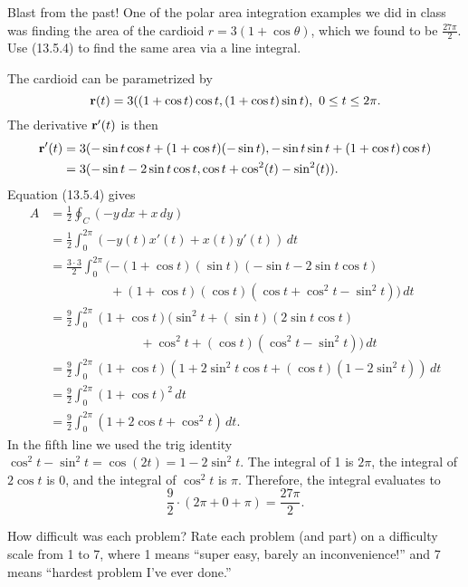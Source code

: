 \begin{problem}
  Blast from the past! One of the polar area integration examples we did in class was finding the area of the cardioid $r=3(1+\cos\theta)$, which we found to be $\frac{27\pi}2$. Use (13.5.4) to find the same area via a line integral.
\end{problem}
\begin{solution}
  The cardioid can be parametrized by
  \[\mathbf r(t) = 3((1+\cos t)\cos t,(1+\cos t)\sin t),\ 0\leq t\leq 2\pi.\]
  The derivative $\mathbf r'(t)$ is then
  \[\begin{split}
    \mathbf r'(t) &=3(-\sin t\cos t+(1+\cos t)(-\sin t),-\sin t\sin t+(1+\cos t)\cos t)\\
    &= 3(-\sin t-2\sin t\cos t,\cos t+\cos^2(t)-\sin^2(t)).
  \end{split}\]
  Equation (13.5.4) gives
  \[\begin{split}
    A &= \frac12\oint_C(-y\,dx+x\,dy)\\
    &= \frac12\int_0^{2\pi}(-y(t)x'(t)+x(t)y'(t))\,dt\\
    &= \frac{3\cdot 3}2\int_0^{2\pi}(-(1+\cos t)(\sin t)(-\sin t-2\sin t\cos t)\\
    &\hspace{2cm}+(1+\cos t)(\cos t)(\cos t+\cos^2t-\sin^2t))\,dt\\
    &= \frac92\int_0^{2\pi}(1+\cos t)(\sin^2t+(\sin t)(2\sin t\cos t)\\
    &\hspace{3cm}+\cos^2 t+(\cos t)(\cos^2 t-\sin^2 t))\,dt\\
    &= \frac92\int_0^{2\pi}(1+\cos t)(1+2\sin^2 t\cos t+(\cos t)(1-2\sin^2 t))\,dt\\
    &= \frac92\int_0^{2\pi}(1+\cos t)^2\,dt\\
    &= \frac92\int_0^{2\pi}(1+2\cos t+\cos^2 t)\,dt.
  \end{split}\]
  In the fifth line we used the trig identity $\cos^2t-\sin^2t=\cos(2t)=1-2\sin^2t$.
  The integral of 1 is $2\pi$, the integral of $2\cos t$ is 0, and the integral of $\cos^2 t$ is $\pi$. Therefore, the integral evaluates to
  \[\frac92\cdot (2\pi+0+\pi)=\frac{27\pi}2.\]
\end{solution}

\begin{problem}
  How difficult was each problem? Rate each problem (and part) on a difficulty scale from 1 to 7, where 1 means ``super easy, barely an inconvenience!'' and 7 means ``hardest problem I've ever done.''
\end{problem}

